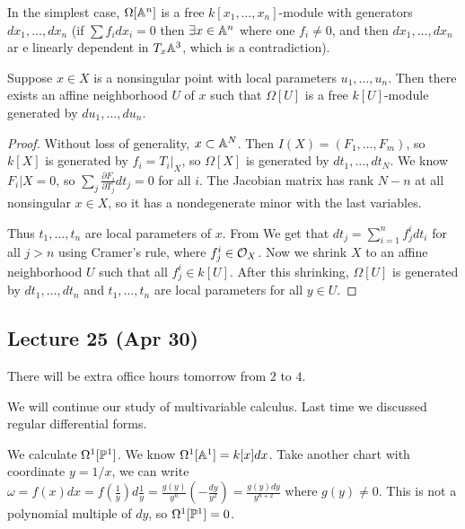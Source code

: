 \documentclass[twoside, 10pt]{article}
\begin{document}
        In the simplest case, $\Omega[\A^n]$ is a free $k[x_1, \ldots,
        x_n]$-module with generators $dx_1, \ldots, dx_n$ (if $\sum f_i dx_i =
        0$ then $\exists x \in \A^n$ where one $f_i \neq 0$, and then $dx_1,
        \ldots, dx_n$ ar e linearly dependent in $T_x\A^3$, which is a
        contradiction).

        \begin{thm} Suppose $x \in X$ is a nonsingular point with local
            parameters $u_1, \ldots, u_n$. Then there exists an affine
            neighborhood $U$ of $x$ such that $\Omega[U]$ is a free
            $k[U]$-module generated by $du_1, \ldots, du_n$.  \begin{proof}
                Without loss of generality, $x \subset \A^N$. Then $I(X) =
                (F_1, \ldots, F_m)$, so $k[X]$ is generated by $f_i = T_i|_X$,
                so $\Omega[X]$ is generated by $dt_1, \ldots, dt_N$. We know
                $F_i|X = 0$, so $\sum_j \frac{\partial F_i}{\partial T_j} dt_j
                = 0$ for all $i$. The Jacobian matrix has rank $N-n$ at all
                nonsingular $x \in X$, so it has a nondegenerate minor with the
                last variables.

                Thus $t_1, \ldots, t_n$ are local parameters of $x$. From We
                get that $dt_j = \sum_{i=1}^n f^i_j dt_i$ for all $j > n$ using
                Cramer's rule, where $f_j^i \in \mc{O}_X$. Now we shrink $X$ to
                an affine neighborhood $U$ such that all $f_j^i \in k[U]$.
            After this shrinking, $\Omega[U]$ is generated by $dt_1, \ldots,
        dt_n$ and $t_1, \ldots, t_n$ are local parameters for all $y \in U$.
    \end{proof} \end{thm}

        \subsection{Lecture 25 (Apr 30)} There will be extra office hours
        tomorrow from $2$ to $4$.

        We will continue our study of multivariable calculus. Last time we
        discussed regular differential forms. 
        
        \begin{exm} We calculate $\Omega^1[\P^1]$. We know $\Omega^1[\A^1] =
            k[x] dx$.  Take another chart with coordinate $y = 1/x$, we can
            write $\omega = f(x) dx = f \left( \frac{1}{y} \right) d
            \frac{1}{y} = \frac{g(y)}{y^n} \left( -\frac{dy}{y^2} \right) =
            \frac{g(y) dy}{y^{n+2}}$ where $g(y) \neq 0$. This is not a
        polynomial multiple of $dy$, so $\Omega^1[\P^1] = 0$.  \end{exm}
\end{document}
